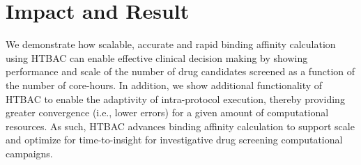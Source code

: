 \documentclass[conference]{IEEEtran}
\begin{document}
\section{Impact and Result}\label{sec:demo}









We demonstrate how scalable, accurate and rapid binding affinity calculation 
using HTBAC can enable effective clinical decision making by showing performance 
and scale of the number of drug candidates screened as a function of the 
number of core-hours. In addition, we show additional functionality of HTBAC 
to enable the adaptivity of intra-protocol execution, thereby providing greater 
convergence (i.e., lower errors) for a given amount of computational resources. 
As such, HTBAC advances binding affinity calculation to support scale and 
optimize for time-to-insight for investigative drug screening computational 
campaigns. 




\end{document}
